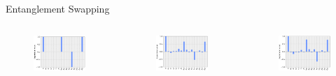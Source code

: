 \begin{frame}{Entanglement Swapping}
\begin{columns}
	\begin{figure}
		\includegraphics[width=1\linewidth]{images/results/swap_pauli_sim.png}
	\end{figure}
	\begin{figure}
		\includegraphics[width=1\linewidth]{images/results/swap_pauli_dev.png}
	\end{figure}	
	\begin{figure}
		\includegraphics[width=1\linewidth]{images/results/swap_pauli_cal.png}

\end{figure}
\end{columns}
\end{frame}
